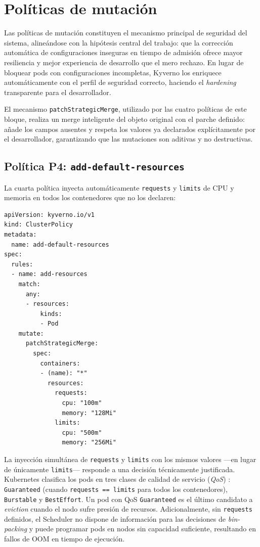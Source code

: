 \section{Políticas de mutación}

Las políticas de mutación constituyen el mecanismo principal de seguridad del sistema, alineándose con la hipótesis central del trabajo: que la corrección automática de configuraciones inseguras en tiempo de admisión ofrece mayor resiliencia y mejor experiencia de desarrollo que el mero rechazo. En lugar de bloquear pods con configuraciones incompletas, Kyverno los enriquece automáticamente con el perfil de seguridad correcto, haciendo el \textit{hardening} transparente para el desarrollador.

El mecanismo \texttt{patchStrategicMerge}, utilizado por las cuatro políticas de este bloque, realiza un merge inteligente del objeto original con el parche definido: añade los campos ausentes y respeta los valores ya declarados explícitamente por el desarrollador, garantizando que las mutaciones son aditivas y no destructivas.

\subsection{Política P4: \texttt{add-default-resources}}

La cuarta política inyecta automáticamente \texttt{requests} y \texttt{limits} de CPU y memoria en todos los contenedores que no los declaren:

\begin{lstlisting}
apiVersion: kyverno.io/v1
kind: ClusterPolicy
metadata:
  name: add-default-resources
spec:
  rules:
  - name: add-resources
    match:
      any:
      - resources:
          kinds:
          - Pod
    mutate:
      patchStrategicMerge:
        spec:
          containers:
          - (name): "*"
            resources:
              requests:
                cpu: "100m"
                memory: "128Mi"
              limits:
                cpu: "500m"
                memory: "256Mi"
\end{lstlisting}

La inyección simultánea de \texttt{requests} y \texttt{limits} con los mismos valores —en lugar de únicamente \texttt{limits}— responde a una decisión técnicamente justificada. Kubernetes clasifica los pods en tres clases de calidad de servicio (\textit{QoS}) \cite{kubernetes_qos}: \texttt{Guaranteed} (cuando \texttt{requests\,==\,limits} para todos los contenedores), \texttt{Burstable} y \texttt{BestEffort}. Un pod con QoS \texttt{Guaranteed} es el último candidato a \textit{eviction} cuando el nodo sufre presión de recursos. Adicionalmente, sin \texttt{requests} definidos, el Scheduler no dispone de información para las decisiones de \textit{bin-packing} y puede programar pods en nodos sin capacidad suficiente, resultando en fallos de OOM en tiempo de ejecución.

